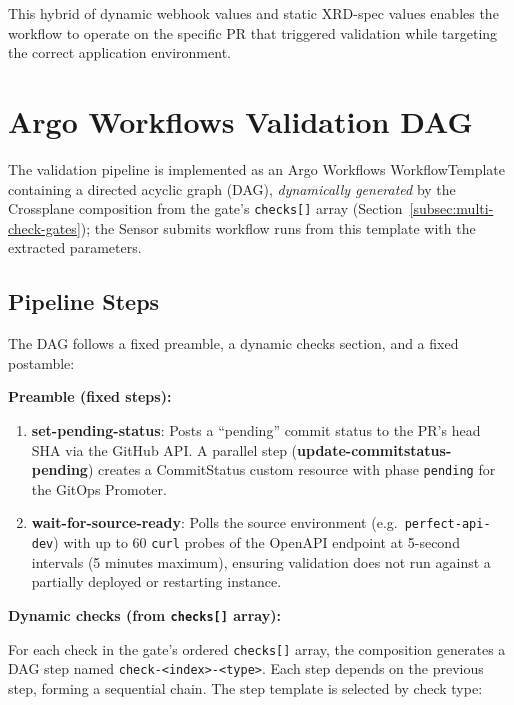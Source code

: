 This hybrid of dynamic webhook values and static XRD-spec values enables the workflow to operate on the specific PR that triggered validation while targeting the correct application environment.

\section{Argo Workflows Validation DAG}
\label{sec:argo-workflows-dag}

The validation pipeline is implemented as an Argo Workflows WorkflowTemplate containing a directed acyclic graph (DAG), \textit{dynamically generated} by the Crossplane composition from the gate's \texttt{checks[]} array (Section~\ref{subsec:multi-check-gates}); the Sensor submits workflow runs from this template with the extracted parameters.

\subsection{Pipeline Steps}
\label{subsec:pipeline-steps}

The DAG follows a fixed preamble, a dynamic checks section, and a fixed postamble:

\textbf{Preamble (fixed steps):}

\begin{enumerate}
    \item \textbf{set-pending-status}: Posts a ``pending'' commit status to the PR's head SHA via the GitHub API. A parallel step (\textbf{update-commitstatus-pending}) creates a CommitStatus custom resource with phase \texttt{pending} for the GitOps Promoter.

    \item \textbf{wait-for-source-ready}: Polls the source environment (e.g.\ \texttt{perfect-api-dev}) with up to 60 \texttt{curl} probes of the OpenAPI endpoint at 5-second intervals (5 minutes maximum), ensuring validation does not run against a partially deployed or restarting instance.
\end{enumerate}

\textbf{Dynamic checks (from \texttt{checks[]} array):}

For each check in the gate's ordered \texttt{checks[]} array, the composition generates a DAG step named \texttt{check-<index>-<type>}. Each step depends on the previous step, forming a sequential chain. The step template is selected by check type:

